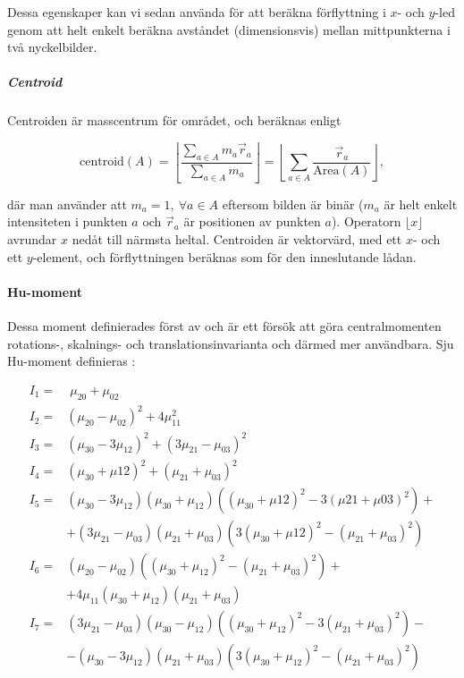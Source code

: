 \documentclass[../rapport_MVEX01-11-05]{subfiles}
\begin{document}
Dessa egenskaper kan vi sedan använda för att beräkna förflyttning i
$x$- och $y$-led genom att helt enkelt beräkna avståndet (dimensionsvis)
mellan mittpunkterna i två nyckelbilder.

\subparagraph{Centroid}

Centroiden är masscentrum för området, och beräknas enligt

\begin{equation*}
  \textrm{centroid}(A) = \left\lfloor\frac{
    \sum\limits_{a\in A}m_a\vec{r}_a
  }{
    \sum\limits_{a\in A}m_a
  }\right\rfloor =
  \left\lfloor\sum\limits_{a\in
  A}\frac{\vec{r}_a}{\textrm{Area}(A)}\right\rfloor,
\end{equation*}

där man använder att $m_a=1,\:\forall a\in A$ eftersom bilden är
binär ($m_a$ är helt enkelt intensiteten i punkten $a$ och
$\vec{r}_a$ är positionen av punkten $a$). Operatorn $\lfloor
x\rfloor$ avrundar $x$ nedåt till närmsta heltal. Centroiden är vektorvärd,
med ett $x$- och ett $y$-element, och förflyttningen beräknas som för
den inneslutande lådan.

\paragraph{Hu-moment}

Dessa moment definierades först av  och är ett försök att
göra centralmomenten rotations-, skalnings- och translationsinvarianta och
därmed mer användbara. Sju Hu-moment definieras \cite[s.~185]{Hu62}:

\begin{align*}
	I_1 =& \;\mu_{20} + \mu_{02}\\
	I_2 =& \left(\mu_{20} - \mu_{02}\right)^2 + 4\mu^2_{11}\\
	I_3 =& \left(\mu_{30} - 3\mu_{12}\right)^2 +
	       \left(3\mu_{21} - \mu_{03}\right)^2\\
	I_4 =& \left(\mu_{30} + \mu{12}\right)^2 +
 	       \left(\mu_{21} + \mu_{03}\right)^2\\
	I_5 =& \left(\mu_{30} - 3\mu_{12}\right)
	       \left(\mu_{30} + \mu_{12}\right)
	       \left(\left(\mu_{30}+\mu{12}\right)^2 -
	       3\left(\mu{21}+\mu{03}\right)^2\right) + \\
 	    &+ \left(3\mu_{21} - \mu_{03}\right)\left(\mu_{21} + \mu_{03}\right)
	       \left(3\left(\mu_{30} + \mu{12}\right)^2 -
	       \left(\mu_{21} + \mu_{03}\right)^2\right)\\
	I_6 =& \left(\mu_{20}-\mu_{02}\right)
	       \left(\left(\mu_{30}+\mu_{12}\right)^2 -
	       \left(\mu_{21}+\mu_{03}\right)^2\right) + \\
	    &+ 4\mu_{11}\left(\mu_{30}+\mu_{12}\right)
	       \left(\mu_{21}+\mu_{03}\right)\\
	I_7 =& \left(3\mu_{21}-\mu_{03}\right)\left(\mu_{30}-\mu_{12}\right)
	       \left(\left(\mu_{30}+\mu_{12}\right)^2 - 
	       3\left(\mu_{21}+\mu_{03}\right)^2\right) - \\
	    &- \left(\mu_{30} - 3\mu_{12}\right)\left(\mu_{21}+\mu_{03}\right)
	       \left(3\left(\mu_{30}+\mu_{12}\right)^2 - 
  	     \left(\mu_{21}+\mu_{03}\right)^2\right)
\end{align*}
\end{document}
